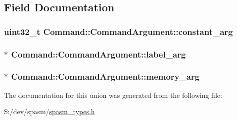 \subsection{\-Field \-Documentation}
\hypertarget{union_command_1_1_command_argument_abac24a4437e622f24b8667b66db36839}{
\subsubsection[{constant\-\_\-arg}]{\setlength{\rightskip}{0pt plus 5cm}uint32\-\_\-t {\bf \-Command\-::\-Command\-Argument\-::constant\-\_\-arg}}}
\label{union_command_1_1_command_argument_abac24a4437e622f24b8667b66db36839}
\hypertarget{union_command_1_1_command_argument_ad35f7f6890ba7afda2f6df885c80ee1b}{
\subsubsection[{label\-\_\-arg}]{$\ast$ {\bf \-Command\-::\-Command\-Argument\-::label\-\_\-arg}}}
\label{union_command_1_1_command_argument_ad35f7f6890ba7afda2f6df885c80ee1b}
\hypertarget{union_command_1_1_command_argument_aa1d92797db179e44197eb21140e4d207}{
\subsubsection[{memory\-\_\-arg}]{$\ast$ {\bf \-Command\-::\-Command\-Argument\-::memory\-\_\-arg}}}
\label{union_command_1_1_command_argument_aa1d92797db179e44197eb21140e4d207}


\-The documentation for this union was generated from the following file\-:\begin{DoxyCompactItemize}
\item 
\-S\-:/dev/spasm/\hyperlink{spasm__types_8h}{spasm\-\_\-types.\-h}\end{DoxyCompactItemize}
